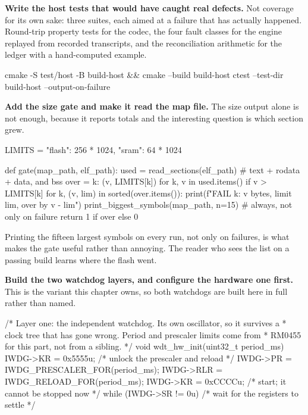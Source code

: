 \begin{steps}
\item \textbf{Write the host tests that would have caught real defects.} Not
coverage for its own sake: three suites, each aimed at a failure that has
actually happened. Round-trip property tests for the codec, the four fault
classes for the engine replayed from recorded transcripts, and the
reconciliation arithmetic for the ledger with a hand-computed example.
\begin{shellcode}
cmake -S test/host -B build-host && cmake --build build-host
ctest --test-dir build-host --output-on-failure
\end{shellcode}

\item \textbf{Add the size gate and make it read the map file.} The size output
alone is not enough, because it reports totals and the interesting question is
which section grew.
\begin{pycode}
LIMITS = {"flash": 256 * 1024, "sram": 64 * 1024}

def gate(map_path, elf_path):
    used = read_sections(elf_path)              # text + rodata + data, and bss
    over = {k: (v, LIMITS[k]) for k, v in used.items() if v > LIMITS[k]}
    for k, (v, lim) in sorted(over.items()):
        print(f"FAIL {k}: {v} bytes, limit {lim}, over by {v - lim}")
    print_biggest_symbols(map_path, n=15)       # always, not only on failure
    return 1 if over else 0
\end{pycode}
Printing the fifteen largest symbols on every run, not only on failures, is what
makes the gate useful rather than annoying. The reader who sees the list on a
passing build learns where the flash went.

\item \textbf{Build the two watchdog layers, and configure the hardware one
first.} This is the variant this chapter owns, so both watchdogs are built here
in full rather than named.
\begin{ccode}
/* Layer one: the independent watchdog. Its own oscillator, so it survives a
 * clock tree that has gone wrong. Period and prescaler limits come from
 * RM0455 for this part, not from a sibling.                                */
void wdt_hw_init(uint32_t period_ms)
{
    IWDG->KR  = 0x5555u;                 /* unlock the prescaler and reload  */
    IWDG->PR  = IWDG_PRESCALER_FOR(period_ms);
    IWDG->RLR = IWDG_RELOAD_FOR(period_ms);
    IWDG->KR  = 0xCCCCu;                 /* start; it cannot be stopped now  */
    while (IWDG->SR != 0u) { }           /* wait for the registers to settle */
}


\end{ccode}
\end{steps}
